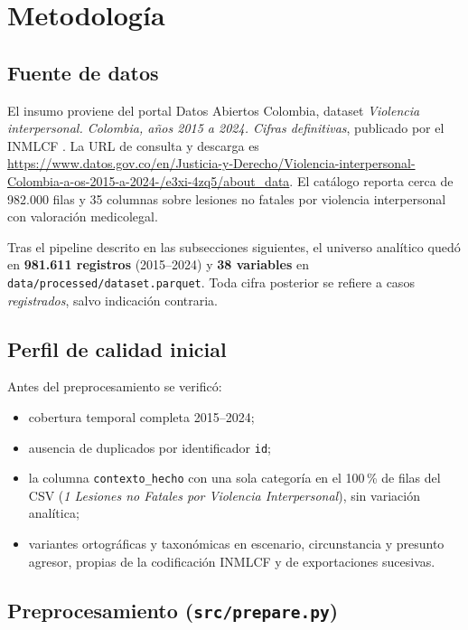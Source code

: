 \documentclass[
	a4paper,
	10pt,
	unnumberedsections,
	twoside,
]{LTJournalArticle}
\begin{document}
\section{Metodolog\'ia}

\subsection{Fuente de datos}

El insumo proviene del portal Datos Abiertos Colombia, dataset \emph{Violencia interpersonal. Colombia, a\~{n}os 2015 a 2024. Cifras definitivas}, publicado por el INMLCF \cite{medicinalegal2024}.
La URL de consulta y descarga es \url{https://www.datos.gov.co/en/Justicia-y-Derecho/Violencia-interpersonal-Colombia-a-os-2015-a-2024-/e3xi-4zq5/about_data}.
El cat\'alogo reporta cerca de 982.000 filas y 35 columnas sobre lesiones no fatales por violencia interpersonal con valoraci\'on medicolegal.

Tras el pipeline descrito en las subsecciones siguientes, el universo anal\'itico qued\'o en \textbf{981.611 registros} (2015--2024) y \textbf{38 variables} en \texttt{data/processed/dataset.parquet}.
Toda cifra posterior se refiere a casos \emph{registrados}, salvo indicaci\'on contraria.

\subsection{Perfil de calidad inicial}

Antes del preprocesamiento se verific\'o:
\begin{itemize}
	\item cobertura temporal completa 2015--2024;
	\item ausencia de duplicados por identificador \texttt{id};
	\item la columna \texttt{contexto\_hecho} con una sola categor\'ia en el 100\,\% de filas del CSV (\emph{1 Lesiones no Fatales por Violencia Interpersonal}), sin variaci\'on anal\'itica;
	\item variantes ortogr\'aficas y taxon\'omicas en escenario, circunstancia y presunto agresor, propias de la codificaci\'on INMLCF y de exportaciones sucesivas.
\end{itemize}

\subsection{Preprocesamiento (\texttt{src/prepare.py})}
\end{document}
